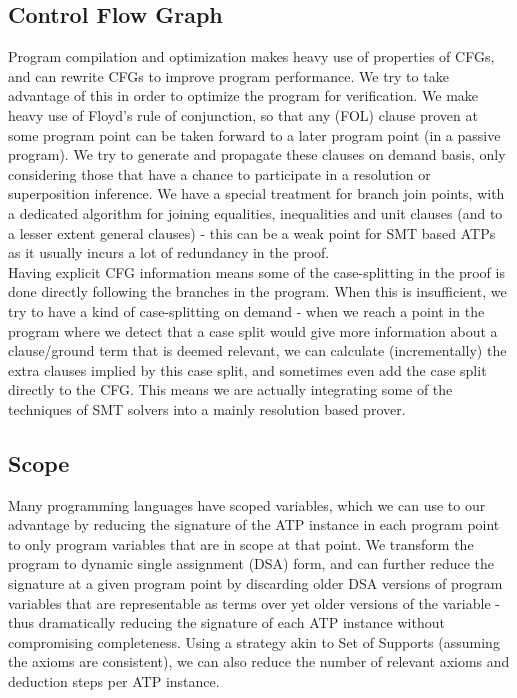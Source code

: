 \subsection{Control Flow Graph}
Program compilation and optimization makes heavy use of properties of CFGs, and can rewrite CFGs to improve program performance.
We try to take advantage of this in order to optimize the program for verification.
We make heavy use of Floyd's rule of conjunction, so that any (FOL) clause proven at some program point can be taken forward to a later program point (in a passive program). We try to generate and propagate these clauses on demand basis, only considering those that have a chance to participate in a resolution or superposition inference.
We have a special treatment for branch join points, with a dedicated algorithm for joining equalities, inequalities and unit clauses (and to a lesser extent general clauses)  - this can be a weak point for SMT based ATPs as it usually incurs a lot of redundancy in the proof.\\
Having explicit CFG information means some of the case-splitting in the proof is done directly following the branches in the program. When this is insufficient, we try to have a kind of case-splitting on demand - when we reach a point in the program where we detect that a case split would give more information about a clause/ground term that is deemed relevant, we can calculate (incrementally) the extra clauses implied by this case split, and sometimes even add the case split directly to the CFG.
This means we are actually integrating some of the techniques of SMT solvers into a mainly resolution based prover.

\subsection{Scope}
Many programming languages have scoped variables, which we can use to our advantage by reducing the signature of the ATP instance in each program point to only program variables that are in scope at that point.
We transform the program to dynamic single assignment (DSA) form, and can further reduce the signature at a given program point by discarding older DSA versions of program variables that are representable as terms over yet older versions of the variable - thus dramatically reducing the signature of each ATP instance without compromising completeness.
Using a strategy akin to Set of Supports (assuming the axioms are consistent), we can also reduce the number of relevant axioms and deduction steps per ATP instance.

